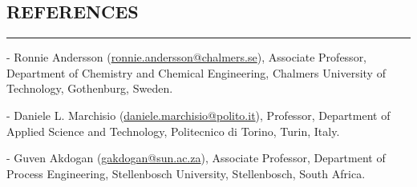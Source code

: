 \documentclass[10pt,a4]{article}
\begin{document}
\begin{small}









\end{small}

\subsection*{REFERENCES}
\hrule
\vspace{0.2cm}

\begin{list}{}{}
\item - Ronnie Andersson (\href{mailto:ronnie.andersson@chalmers.se}{ronnie.andersson@chalmers.se}), Associate Professor, Department of Chemistry and Chemical Engineering, Chalmers University of Technology, Gothenburg, Sweden.
\item - Daniele L. Marchisio (\href{mailto:daniele.marchisio@polito.it}{daniele.marchisio@polito.it}), Professor, Department of Applied Science and Technology, Politecnico di Torino, Turin, Italy.
\item - Guven Akdogan (\href{mailto:gakdogan@sun.ac.za}{gakdogan@sun.ac.za}), Associate Professor, Department of Process Engineering, Stellenbosch University, Stellenbosch, South Africa.
\end{list}

\thispagestyle{fancy}
\rfoot{\textcolor{gray}{Page \thepage}}
\fancyfoot[C]{}
\end{document}
